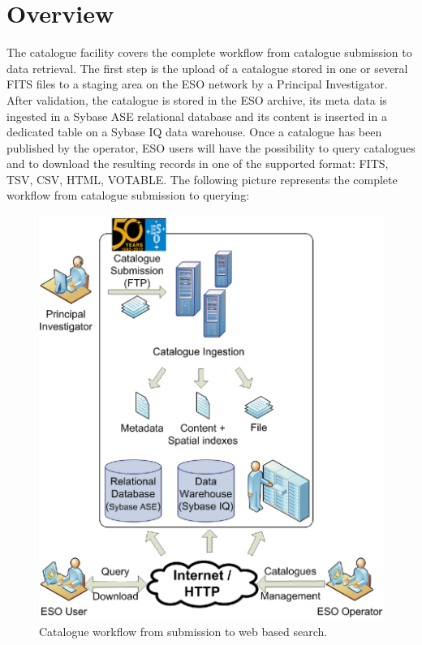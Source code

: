 \section{Overview}
The catalogue facility covers the complete workflow from catalogue submission to data retrieval. The first step is the upload of a catalogue stored in one or several FITS files to a staging area on the ESO network by a Principal Investigator. After validation, the catalogue is stored in the ESO archive, its meta data is ingested in a Sybase ASE relational database and its content is inserted in a dedicated table on a Sybase IQ data warehouse. Once a catalogue has been published by the operator, ESO users will have the possibility to query catalogues and to download the resulting records in one of the supported format: FITS, TSV, CSV, HTML, VOTABLE. The following picture represents the complete workflow from catalogue submission to querying:
\begin{center}
\begin{figure}[ht!]
\centering
\includegraphics [scale=0.7]{part8/Moins_P64/P64_1.eps}
\caption{Catalogue workflow from submission to web based search.}
\end{figure}
\end{center}

